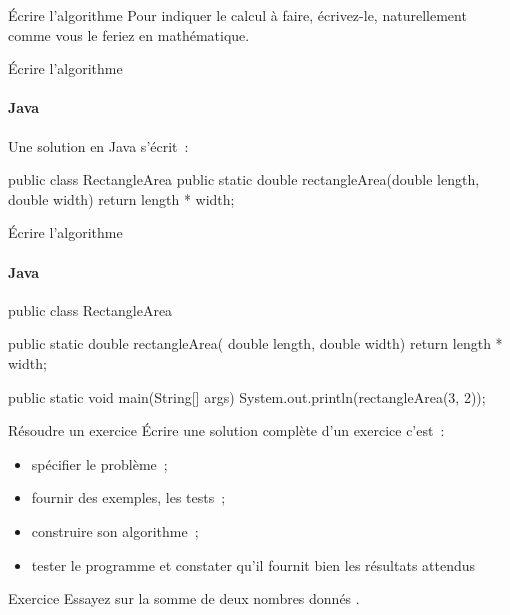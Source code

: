 \begin{hideedit}
\begin{frame}{Écrire l'algorithme}
{  Pour indiquer le calcul à faire, écrivez-le, naturellement comme
  vous le feriez en mathématique.
  }
\end{frame}

\begin{frame}[fragile]{Écrire l'algorithme}
  \framesubtitle{Java}

  Une solution en Java s'écrit~:
\begin{java}
public class RectangleArea {
  public static double rectangleArea(double length, double width) {
    return length * width;
  }
}
\end{java}
\end{frame}

\begin{frame}[fragile]{Écrire l'algorithme}
  \framesubtitle{Java}
\begin{java}
public class RectangleArea {
  public static double rectangleArea(
      double length, double width) {
    return length * width;
  }

  public static void main(String[] args) {
    System.out.println(rectangleArea(3, 2));
  }
}
\end{java}
\end{frame}

\begin{frame}{Résoudre un exercice}
  Écrire une solution complète d'un exercice c'est~:
  \begin{itemize}
    \item spécifier le problème~;
    \item fournir des exemples, les tests~;
    \item construire son algorithme~;
    \item tester le programme et constater qu'il fournit bien les
      résultats attendus
  \end{itemize}

  \pause
  \begin{block}{Exercice}
    Essayez sur \og la somme de deux nombres donnés \fg.
  \end{block}
\end{frame}


\end{hideedit}
